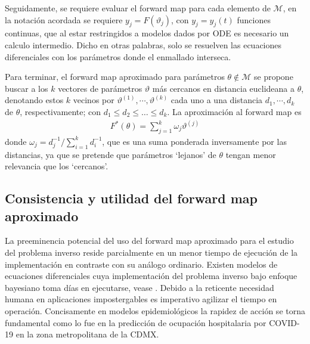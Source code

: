 Seguidamente, se requiere evaluar el forward map para cada elemento de $\mathcal{M}$, en la notación acordada se requiere $y_j = F(\vartheta_j)$, con $y_j = y_j(t)$ funciones continuas, que al estar restringidos a modelos dados por ODE es necesario un calculo intermedio. Dicho en otras palabras, solo se resuelven las ecuaciones diferenciales con los parámetros donde el enmallado interseca.

Para terminar, el forward map aproximado para parámetros $\theta \notin \mathcal{M}$ se propone buscar a los $k$ vectores de parámetros $\vartheta$ más cercanos en distancia euclideana a $\theta$, denotando estos $k$ vecinos por $\vartheta^{(1)}, \cdots, \vartheta^{(k)}$ cada uno a una distancia $d_1, \cdots, d_k$ de $\theta$, respectivamente; con $d_1 \leq d_2 \leq \dots \leq d_k$. La aproximación al forward map es
\begin{align}
    F^{*}(\theta) = \sum_{j = 1}^{k} \omega_j \vartheta^{(j)}
\end{align}
donde $\omega_j = d_j^{-1}/ \sum_{i=1}^{k} d_i^{-1}$, que es una suma ponderada inversamente por las distancias, ya que se pretende que parámetros `lejanos' de $\theta$ tengan menor relevancia que los `cercanos'. 


\subsection*{Consistencia y utilidad del forward map aproximado}

La preeminencia potencial del uso del forward map aproximado para el estudio del problema inverso reside parcialmente en un menor tiempo de ejecución de la implementación en contraste con su análogo ordinario. Existen modelos de ecuaciones diferenciales cuya implementación del problema inverso bajo enfoque bayesiano toma días en ejecutarse, vease \cite{}.
Debido a la reticente necesidad humana en aplicaciones impostergables es imperativo agilizar el tiempo en operación. Concisamente en modelos epidemiológicos la rapidez de acción se torna fundamental como lo fue en la predicción de ocupación hospitalaria por COVID-19 en la zona metropolitana de la CDMX. \cite{}
















